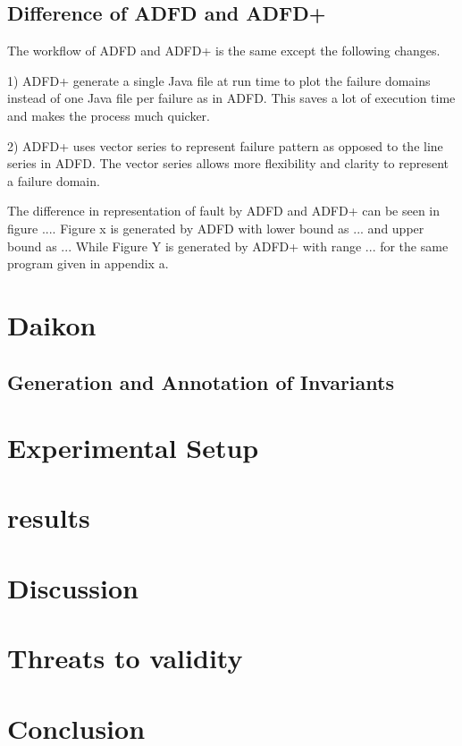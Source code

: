 \documentclass{acm_proc_article-sp}
\begin{document}

\subsection{Difference of ADFD and ADFD+}
The workflow of ADFD and ADFD+ is the same except the following changes.

1) ADFD+ generate a single Java file at run time to plot the failure domains instead of one Java file per failure as in ADFD. This saves a lot of execution time and makes the process much quicker.

2) ADFD+ uses vector series to represent failure pattern as opposed to the line series in ADFD. The vector series allows more flexibility and clarity to represent a failure domain.   

The difference in representation of fault by ADFD and ADFD+ can be seen in figure .... Figure x is generated by ADFD with lower bound as ... and upper bound as ... While Figure Y is generated by ADFD+ with range ... for the same program given in appendix a. 


\section{Daikon}
\subsection{Generation and Annotation of Invariants}




\section{Experimental Setup}

\section{results}
\section{Discussion}
\section{Threats to validity}
\section{Conclusion}
\end{document}
